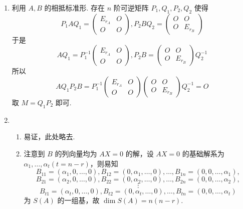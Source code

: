 \begin{enumerate}
    \item 利用 $A,B$ 的相抵标准形. 存在 $n$ 阶可逆矩阵 $P_1,Q_1,P_2,Q_2$ 使得
          \[P_1AQ_1=\begin{pmatrix}E_{r_A} & O \\ O & O\end{pmatrix},P_2BQ_2=\begin{pmatrix}O & O \\ O & E_{r_B}\end{pmatrix}\]
          于是 \[AQ_1=P_1^{-1}\begin{pmatrix}E_{r_A} & O \\ O & O\end{pmatrix},P_2B=\begin{pmatrix}O & O \\ O & E_{r_B}\end{pmatrix}Q_2^{-1}\]
          所以 \[AQ_1P_2B=P_1^{-1}\begin{pmatrix}E_{r_A} & O \\ O & O\end{pmatrix}\begin{pmatrix}O & O \\ O & E_{r_B}\end{pmatrix}Q_2^{-1}=O\]
          取 $M=Q_1P_2$ 即可.

    \item \begin{enumerate}
              \item 易证，此处略去.

              \item 注意到 $B$ 的列向量均为 $AX=0$ 的解，设 $AX=0$ 的基础解系为 $\alpha_1,\ldots,\alpha_t(t=n-r)$，则易知
                    \[B_{11}=(\alpha_1,0,\ldots,0),B_{12}=(0,\alpha_1,\ldots,0),\ldots,B_{1n}=(0,0,\ldots,\alpha_1),\]
                    \[B_{21}=(\alpha_2,0,\ldots,0),B_{22}=(0,\alpha_2,\ldots,0),\ldots,B_{2n}=(0,0,\ldots,\alpha_2),\]
                    \[\vdots\]
                    \[B_{t1}=(\alpha_t,0,\ldots,0),B_{t2}=(0,\alpha_t,\ldots,0),\ldots,B_{tn}=(0,0,\ldots,\alpha_t)\]
                    为 $S(A)$ 的一组基，故 $\dim S(A)=n(n-r)$.
          \end{enumerate}
\end{enumerate}

